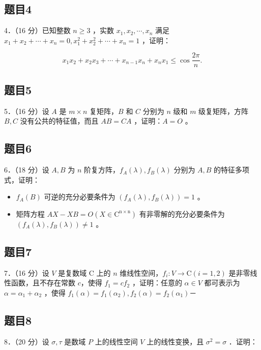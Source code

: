 \documentclass{article}
\begin{document}
\subsection{题目4}
4．（16 分）已知整数 \(n \geq 3\) ，实数 \(x_{1}, x_{2}, \cdots, x_{n}\) 满足 \(x_{1}+x_{2}+\cdots+x_{n}=0, x_{1}^{2}+x_{2}^{2}+\cdots+x_{n}=1\) ，证明：

\[
x_{1} x_{2}+x_{2} x_{3}+\cdots+x_{n-1} x_{n}+x_{n} x_{1} \leq \cos \frac{2 \pi}{n} .
\]

\subsection{题目5}
5．（16 分）设 \(A\) 是 \(m \times n\) 复矩阵，\(B\) 和 \(C\) 分别为 \(n\) 级和 \(m\) 级复矩阵，方阵 \(B, C\) 没有公共的特征值，而且 \(A B=C A\) ，证明：\(A=O\) 。

\subsection{题目6}
6．（18 分）设 \(A, B\) 为 \(n\) 阶复方阵，\(f_{A}(\lambda), f_{B}(\lambda)\) 分别为 \(A, B\) 的特征多项式，证明：

\begin{itemize}
  \item[（1）] \(f_{A}(B)\) 可逆的充分必要条件为 \(\left(f_{A}(\lambda), f_{B}(\lambda)\right)=1\) 。
  \item[（2）] 矩阵方程 \(A X-X B=O\left(X \in \mathrm{C}^{\mathrm{n} \times \mathrm{n}}\right)\) 有非零解的充分必要条件为 \(\left(f_{A}(\lambda), f_{B}(\lambda)\right) \neq 1\) 。
\end{itemize}

\subsection{题目7}
7．（16 分）设 \(V\) 是复数域 C 上的 \(n\) 维线性空间，\(f_{i}: V \rightarrow \mathrm{C}(i=1,2)\) 是非零线性函数，且不存在常数 \(c\)，使得 \(f_{1}=c f_{2}\) ，证明：任意的 \(\alpha \in V\) 都可表示为 \(\alpha=\alpha_{1}+\alpha_{2}\) ，使得 \(f_{1}(\alpha)=f_{1}\left(\alpha_{2}\right), f_{2}(\alpha)=f_{2}\left(\alpha_{1}\right)\)－

\subsection{题目8}
8．（20 分）设 \(\sigma, \tau\) 是数域 \(P\) 上的线性空间 \(V\) 上的线性变换，且 \(\sigma^{2}=\sigma\) ．证明：
\end{document}
